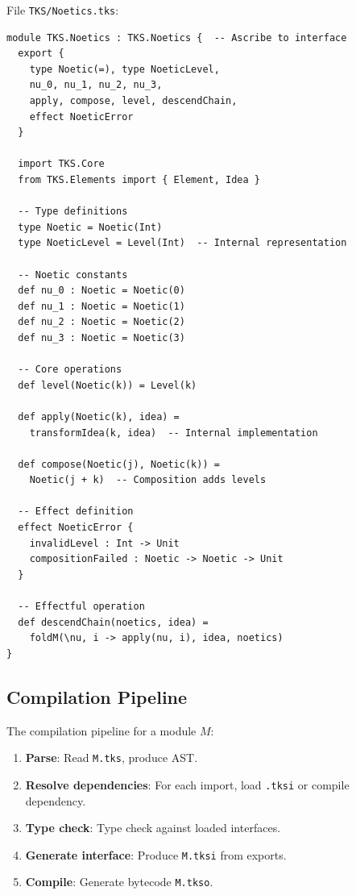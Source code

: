 \begin{example}
\label{ex:implementation-file}
File \texttt{TKS/Noetics.tks}:
\begin{verbatim}
module TKS.Noetics : TKS.Noetics {  -- Ascribe to interface
  export {
    type Noetic(=), type NoeticLevel,
    nu_0, nu_1, nu_2, nu_3,
    apply, compose, level, descendChain,
    effect NoeticError
  }

  import TKS.Core
  from TKS.Elements import { Element, Idea }

  -- Type definitions
  type Noetic = Noetic(Int)
  type NoeticLevel = Level(Int)  -- Internal representation

  -- Noetic constants
  def nu_0 : Noetic = Noetic(0)
  def nu_1 : Noetic = Noetic(1)
  def nu_2 : Noetic = Noetic(2)
  def nu_3 : Noetic = Noetic(3)

  -- Core operations
  def level(Noetic(k)) = Level(k)

  def apply(Noetic(k), idea) =
    transformIdea(k, idea)  -- Internal implementation

  def compose(Noetic(j), Noetic(k)) =
    Noetic(j + k)  -- Composition adds levels

  -- Effect definition
  effect NoeticError {
    invalidLevel : Int -> Unit
    compositionFailed : Noetic -> Noetic -> Unit
  }

  -- Effectful operation
  def descendChain(noetics, idea) =
    foldM(\nu, i -> apply(nu, i), idea, noetics)
}
\end{verbatim}
\end{example}

\subsection{Compilation Pipeline}
\label{subsec:compilation-pipeline}

\begin{definition}
\label{def:compilation-steps}
The compilation pipeline for a module $M$:
\begin{enumerate}
  \item \textbf{Parse}: Read \texttt{M.tks}, produce AST.
  \item \textbf{Resolve dependencies}: For each import, load \texttt{.tksi} or compile dependency.
  \item \textbf{Type check}: Type check against loaded interfaces.
  \item \textbf{Generate interface}: Produce \texttt{M.tksi} from exports.
  \item \textbf{Compile}: Generate bytecode \texttt{M.tkso}.
\end{enumerate}
\end{definition}

